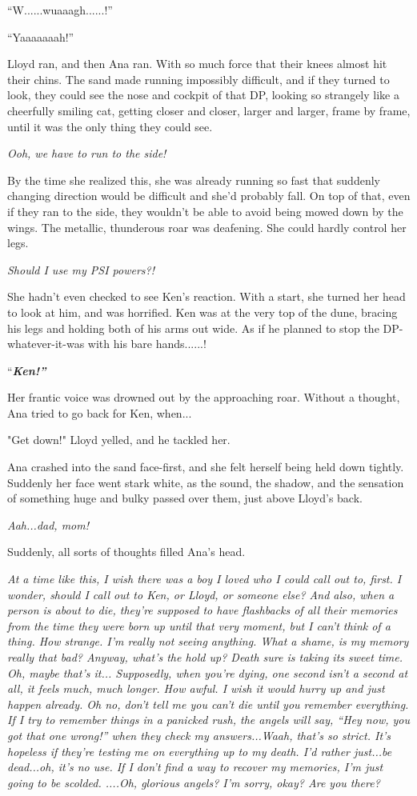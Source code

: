 \documentclass[
]{article}
\begin{document}
``W......wuaaagh......!''

``Yaaaaaaah!''

Lloyd ran, and then Ana ran. With so much force that their knees almost
hit their chins. The sand made running impossibly difficult, and if they
turned to look, they could see the nose and cockpit of that DP, looking
so strangely like a cheerfully smiling cat, getting closer and closer,
larger and larger, frame by frame, until it was the only thing they
could see.

\emph{Ooh, we have to run to the side!}

By the time she realized this, she was already running so fast that
suddenly changing direction would be difficult and she'd probably fall.
On top of that, even if they ran to the side, they wouldn't be able to
avoid being mowed down by the wings. The metallic, thunderous roar was
deafening. She could hardly control her legs.

\emph{Should I use my PSI powers?!}

She hadn't even checked to see Ken's reaction. With a start, she turned
her head to look at him, and was horrified. Ken was at the very top of
the dune, bracing his legs and holding both of his arms out wide. As if
he planned to stop the DP-whatever-it-was with his bare hands......!

``\emph{\textbf{Ken!''}}

Her frantic voice was drowned out by the approaching roar. Without a
thought, Ana tried to go back for Ken, when...

"Get down!" Lloyd yelled, and he tackled her.

Ana crashed into the sand face-first, and she felt herself being held
down tightly. Suddenly her face went stark white, as the sound, the
shadow, and the sensation of something huge and bulky passed over them,
just above Lloyd's back.

\emph{Aah...dad, mom!}

Suddenly, all sorts of thoughts filled Ana's head.

\emph{At a time like this, I wish there was a boy I loved who I could
call out to, first. I wonder, should I call out to Ken, or Lloyd, or
someone else? And also, when a person is about to die, they're supposed
to have flashbacks of all their memories from the time they were born up
until that very moment, but I can't think of a thing. How strange. I'm
really not seeing anything. What a shame, is my memory really that bad?
Anyway, what's the hold up? Death sure is taking its sweet time. Oh,
maybe that's it... Supposedly, when you're dying, one second isn't a
second at all, it feels much, much longer. How awful. I wish it would
hurry up and just happen already. Oh no, don't tell me you can't die
until you remember everything. If I try to remember things in a panicked
rush, the angels will say, ``Hey now, you got that one wrong!'' when
they check my answers...Waah, that's so strict. It's hopeless if they're
testing me on everything up to my death. I'd rather just...be dead...oh,
it's no use. If I don't find a way to recover my memories, I'm just
going to be scolded. ....Oh, glorious angels? I'm sorry, okay? Are you
there?}
\end{document}
